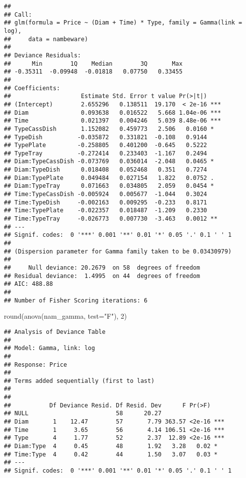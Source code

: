 \documentclass[
]{article}
\newenvironment{Shaded}{\begin{snugshade}}{\end{snugshade}}
\newcommand{\AttributeTok}[1]{\textcolor[rgb]{0.77,0.63,0.00}{#1}}
\newcommand{\DecValTok}[1]{\textcolor[rgb]{0.00,0.00,0.81}{#1}}
\newcommand{\FunctionTok}[1]{\textcolor[rgb]{0.00,0.00,0.00}{#1}}
\newcommand{\NormalTok}[1]{#1}
\newcommand{\StringTok}[1]{\textcolor[rgb]{0.31,0.60,0.02}{#1}}
\begin{document}
\begin{verbatim}
## 
## Call:
## glm(formula = Price ~ (Diam + Time) * Type, family = Gamma(link = log), 
##     data = nambeware)
## 
## Deviance Residuals: 
##      Min        1Q    Median        3Q       Max  
## -0.35311  -0.09948  -0.01818   0.07750   0.33455  
## 
## Coefficients:
##                    Estimate Std. Error t value Pr(>|t|)    
## (Intercept)        2.655296   0.138511  19.170  < 2e-16 ***
## Diam               0.093638   0.016522   5.668 1.04e-06 ***
## Time               0.021397   0.004246   5.039 8.48e-06 ***
## TypeCassDish       1.152082   0.459773   2.506   0.0160 *  
## TypeDish          -0.035872   0.331821  -0.108   0.9144    
## TypePlate         -0.258805   0.401200  -0.645   0.5222    
## TypeTray          -0.272414   0.233403  -1.167   0.2494    
## Diam:TypeCassDish -0.073769   0.036014  -2.048   0.0465 *  
## Diam:TypeDish      0.018408   0.052468   0.351   0.7274    
## Diam:TypePlate     0.049484   0.027154   1.822   0.0752 .  
## Diam:TypeTray      0.071663   0.034805   2.059   0.0454 *  
## Time:TypeCassDish -0.005924   0.005677  -1.044   0.3024    
## Time:TypeDish     -0.002163   0.009295  -0.233   0.8171    
## Time:TypePlate    -0.022357   0.018487  -1.209   0.2330    
## Time:TypeTray     -0.026773   0.007730  -3.463   0.0012 ** 
## ---
## Signif. codes:  0 '***' 0.001 '**' 0.01 '*' 0.05 '.' 0.1 ' ' 1
## 
## (Dispersion parameter for Gamma family taken to be 0.03430979)
## 
##     Null deviance: 20.2679  on 58  degrees of freedom
## Residual deviance:  1.4995  on 44  degrees of freedom
## AIC: 488.88
## 
## Number of Fisher Scoring iterations: 6
\end{verbatim}

\begin{Shaded}
\begin{Highlighting}[]
\FunctionTok{round}\NormalTok{(}\FunctionTok{anova}\NormalTok{(nam\_gamma, }\AttributeTok{test=}\StringTok{"F"}\NormalTok{), }\DecValTok{2}\NormalTok{)}
\end{Highlighting}
\end{Shaded}

\begin{verbatim}
## Analysis of Deviance Table
## 
## Model: Gamma, link: log
## 
## Response: Price
## 
## Terms added sequentially (first to last)
## 
## 
##           Df Deviance Resid. Df Resid. Dev      F Pr(>F)    
## NULL                         58      20.27                  
## Diam       1    12.47        57       7.79 363.57 <2e-16 ***
## Time       1     3.65        56       4.14 106.51 <2e-16 ***
## Type       4     1.77        52       2.37  12.89 <2e-16 ***
## Diam:Type  4     0.45        48       1.92   3.28   0.02 *  
## Time:Type  4     0.42        44       1.50   3.07   0.03 *  
## ---
## Signif. codes:  0 '***' 0.001 '**' 0.01 '*' 0.05 '.' 0.1 ' ' 1
\end{verbatim}
\end{document}
